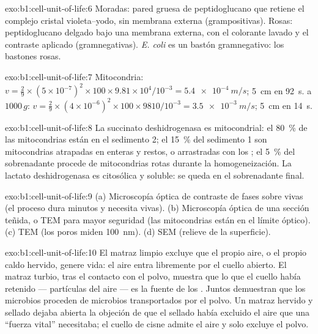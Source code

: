 \begin{solution}{exo:b1:cell-unit-of-life:6}
Moradas: pared gruesa de peptidoglucano que retiene el complejo cristal
violeta--yodo, sin membrana externa (grampositivas). Rosas: peptidoglucano
delgado bajo una membrana externa, con el colorante lavado y el contraste
aplicado (gramnegativas). \emph{E. coli} es un bastón gramnegativo: los
bastones rosas.
\end{solution}

\begin{solution}{exo:b1:cell-unit-of-life:7}
Mitocondria: $v = \frac{2}{9}\times(5\times 10^{-7})^2\times 100\times
9.81\times 10^4/10^{-3} = \qty{5.4e-4}{m/s}$; \qty{5}{cm} en
\qty{92}{s}.  a $1000\,g$: $v = \frac{2}{9}\times(4\times
10^{-6})^2\times 100\times 9810/10^{-3} = \qty{3.5e-3}{m/s}$; \qty{5}{cm}
en \qty{14}{s}.
\end{solution}

\begin{solution}{exo:b1:cell-unit-of-life:8}
La succinato deshidrogenasa es mitocondrial: el \qty{80}{\%} de las
mitocondrias están en el sedimento 2; el \qty{15}{\%} del sedimento 1 son
mitocondrias atrapadas en  enteras y restos, o arrastradas con los
; el \qty{5}{\%} del sobrenadante procede de mitocondrias rotas
durante la homogeneización. La lactato deshidrogenasa es citosólica y
soluble: se queda en el sobrenadante final.
\end{solution}

\begin{solution}{exo:b1:cell-unit-of-life:9}
(a) Microscopía óptica de contraste de fases sobre  vivas (el proceso
dura minutos y necesita  vivas). (b) Microscopía óptica de una
sección teñida, o TEM para mayor seguridad (las mitocondrias están en el
límite óptico). (c) TEM (los poros miden \qty{100}{nm}). (d) SEM (relieve de
la superficie).
\end{solution}

\begin{solution}{exo:b1:cell-unit-of-life:10}
El matraz limpio excluye que el propio aire, o el propio caldo hervido,
genere vida: el aire entra libremente por el cuello abierto. El matraz
turbio, tras el contacto con el polvo, muestra que lo que el cuello había
retenido --- partículas del aire --- es la fuente de los . Juntos
demuestran que los microbios proceden de microbios transportados por el
polvo. Un matraz hervido y sellado dejaba abierta la objeción de que el
sellado había excluido el aire que una ``fuerza vital'' necesitaba; el
cuello de cisne admite el aire y solo excluye el polvo.
\end{solution}

